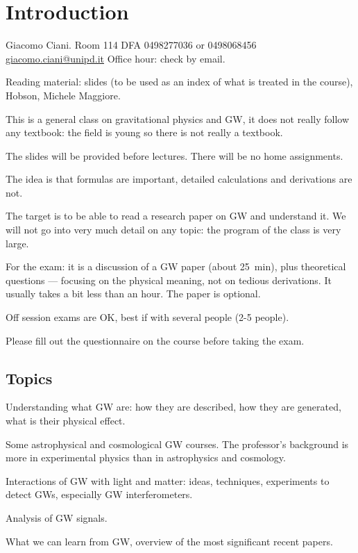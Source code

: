 \documentclass[main.tex]{subfiles}
\begin{document}

\section{Introduction}

Giacomo Ciani. Room 114 DFA
0498277036 or 0498068456
\url{giacomo.ciani@unipd.it}
Office hour: check by email.

Reading material: slides (to be used as an index of what is treated in the course), Hobson, Michele Maggiore.

This is a general class on gravitational physics and GW, it does not really follow any textbook:
the field is young so there is not really a textbook. 

The slides will be provided before lectures. There will be no home assignments. 

The idea is that formulas are important, detailed calculations and derivations are not. 

The target is to be able to read a research paper on GW and understand it. 
We will not go into very much detail on any topic:
the program of the class is very large. 

For the exam: it is a discussion of a GW paper (about \SI{25}{min}), plus theoretical questions --- focusing on the physical meaning, not on tedious derivations. It usually takes a bit less than an hour. 
The paper is optional. 

Off session exams are OK, best if with several people (2-5 people). 

Please fill out the questionnaire on the course before taking the exam. 


\subsection{Topics}

Understanding what GW are: how they are described, how they are generated, what is their physical effect. 

Some astrophysical and cosmological GW courses. 
The professor's background is more in experimental physics than in astrophysics and cosmology. 

Interactions of GW with light and matter: ideas, techniques, experiments to detect GWs, especially GW interferometers.

Analysis of GW signals. 

What we can learn from GW, overview of the most significant recent papers. 
\end{document}
